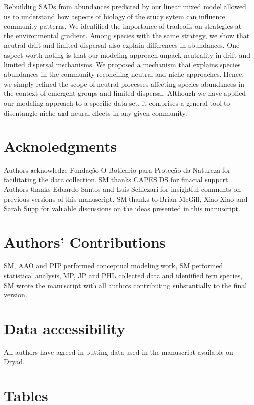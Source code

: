 \documentclass[12pt]{article}
\begin{document}
Rebuilding SADs from abundances predicted by our linear mixed model  
allowed us to understand how aspects of biology of the study sytem can influence community
patterns. We %
identified the importance of tradeoffs on strategies at the environmental gradient. Among species with the
same strategy, we show that
neutral drift and limited dispersal also explain differences in
abundances.  
One aspect worth noting is
that our modeling approach unpack neutrality in drift and limited
dispersal mechanisms. 
We proposed a mechanism that explains species
abundances in the community reconciling neutral and niche
approaches. Hence, we simply refined the scope of neutral processes
affecting species abundances in the context of emergent groups and
limited dispersal. Although we have applied our modeling approach to a specific data set, it comprises a general tool to disentangle niche and neural effects in any given community. 

\section*{Acknoledgments} 
Authors acknowledge Fundação O Boticário para Proteção da Natureza for facilitating the data collection. SM thanks CAPES DS for finacial support. Authors thanks Eduardo Santos and Luis Schiezari for insightful comments on previous versions of this manuscript. SM thanks to Brian McGill, Xiao Xiao and Sarah Supp for valuable discussions on the ideas presented in this manuscript.

\section*{Authors' Contributions} 
SM, AAO and PIP performed conceptual modeling work, SM performed statistical analysis, MP, JP and PHL collected data and identified fern species, SM wrote the manuscript with all authors contributing substantially to the final version.

\section*{Data accessibility} 
All authors have agreed in putting data used in the manuscript available on Dryad.




\newpage 


\section*{Tables}
\end{document}
